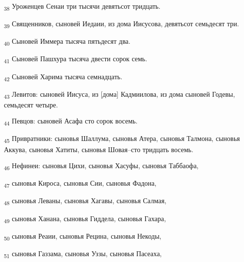 \begin{tcolorbox}
\textsubscript{38} Уроженцев Сенаи три тысячи девятьсот тридцать.
\end{tcolorbox}
\begin{tcolorbox}
\textsubscript{39} Священников, сыновей Иедаии, из дома Иисусова, девятьсот семьдесят три.
\end{tcolorbox}
\begin{tcolorbox}
\textsubscript{40} Сыновей Иммера тысяча пятьдесят два.
\end{tcolorbox}
\begin{tcolorbox}
\textsubscript{41} Сыновей Пашхура тысяча двести сорок семь.
\end{tcolorbox}
\begin{tcolorbox}
\textsubscript{42} Сыновей Харима тысяча семнадцать.
\end{tcolorbox}
\begin{tcolorbox}
\textsubscript{43} Левитов: сыновей Иисуса, из [дома] Кадмиилова, из дома сыновей Годевы, семьдесят четыре.
\end{tcolorbox}
\begin{tcolorbox}
\textsubscript{44} Певцов: сыновей Асафа сто сорок восемь.
\end{tcolorbox}
\begin{tcolorbox}
\textsubscript{45} Привратники: сыновья Шаллума, сыновья Атера, сыновья Талмона, сыновья Аккува, сыновья Хатиты, сыновья Шовая--сто тридцать восемь.
\end{tcolorbox}
\begin{tcolorbox}
\textsubscript{46} Нефинеи: сыновья Цихи, сыновья Хасуфы, сыновья Таббаофа,
\end{tcolorbox}
\begin{tcolorbox}
\textsubscript{47} сыновья Кироса, сыновья Сии, сыновья Фадона,
\end{tcolorbox}
\begin{tcolorbox}
\textsubscript{48} сыновья Леваны, сыновья Хагавы, сыновья Салмая,
\end{tcolorbox}
\begin{tcolorbox}
\textsubscript{49} сыновья Ханана, сыновья Гиддела, сыновья Гахара,
\end{tcolorbox}
\begin{tcolorbox}
\textsubscript{50} сыновья Реаии, сыновья Рецина, сыновья Некоды,
\end{tcolorbox}
\begin{tcolorbox}
\textsubscript{51} сыновья Газзама, сыновья Уззы, сыновья Пасеаха,
\end{tcolorbox}
